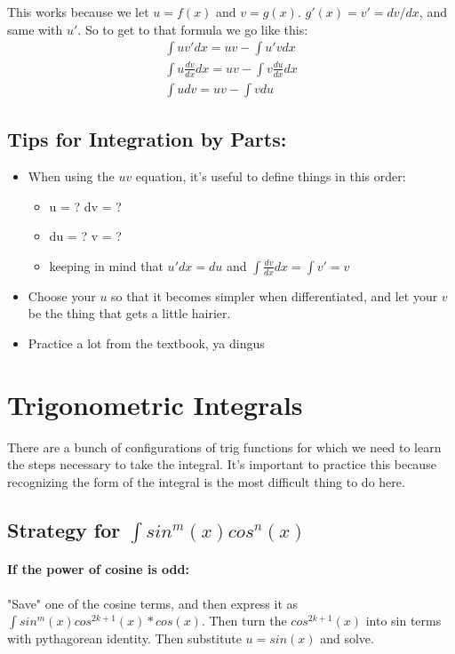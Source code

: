 \documentclass[a4paper,12pt]{report}
\begin{document}
This works because we let $u = f(x)$ and $v = g(x)$. $g'(x) = v' = dv/dx$, and same with $u'$. So to get to that formula we go like this:
\begin{eqnarray}
\int uv' dx = uv - \int u'v dx \\
\int u \frac{dv}{dx} dx = uv - \int v \frac{du}{dx} dx \\
\int u dv = uv - \int v du
\end{eqnarray}

\subsection{Tips for Integration by Parts:}
\begin{itemize}
\item When using the $uv$ equation, it's useful to define things in this order:
\begin{itemize}
\item u = ? dv = ?
\item du = ? v = ?
\item keeping in mind that $u'dx = du$ and $\int \frac{dv}{dx} dx = \int v' = v$
\end{itemize}
\item Choose your $u$ so that it becomes simpler when differentiated, and let your $v$ be the thing that gets a little hairier.
\item Practice a lot from the textbook, ya dingus
\end{itemize}

\section{Trigonometric Integrals}
There are a bunch of configurations of trig functions for which we need to learn the steps necessary to take the integral. It's important to practice this because recognizing the form of the integral is the most difficult thing to do here.
\subsection{Strategy for $\int sin^m (x)cos^n (x)$}
\paragraph{If the power of cosine is odd:}
"Save" one of the cosine terms, and then express it as $\int sin^m(x)cos^{2k+1}(x)*cos(x)$. Then turn the $cos^{2k+1}(x)$ into sin terms with pythagorean identity. Then substitute $u = sin(x)$ and solve.
\end{document}
